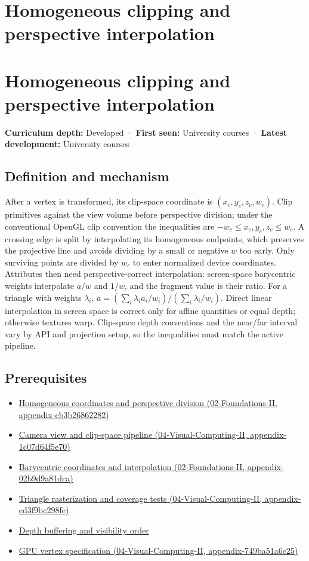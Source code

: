 \hypertarget{appendix-40426e4b2103}{}
\section*{Homogeneous clipping and perspective interpolation}
\section{Homogeneous clipping and perspective interpolation}\label{homogeneous-clipping-and-perspective-interpolation}

\textbf{Curriculum depth:} Developed · \textbf{First seen:} University courses · \textbf{Latest development:} University courses

\subsection{Definition and mechanism}\label{definition-and-mechanism}

After a vertex is transformed, its clip-space coordinate is \((x_c,y_c,z_c,w_c)\). Clip primitives against the view volume before perspective division; under the conventional OpenGL clip convention the inequalities are \(-w_c\le x_c,y_c,z_c\le w_c\). A crossing edge is split by interpolating its homogeneous endpoints, which preserves the projective line and avoids dividing by a small or negative \(w\) too early. Only surviving points are divided by \(w_c\) to enter normalized device coordinates. Attributes then need perspective-correct interpolation: screen-space barycentric weights interpolate \(a/w\) and \(1/w\), and the fragment value is their ratio. For a triangle with weights \(\lambda_i\), \(a=(\sum_i\lambda_i a_i/w_i)/(\sum_i\lambda_i/w_i)\). Direct linear interpolation in screen space is correct only for affine quantities or equal depth; otherwise textures warp. Clip-space depth conventions and the near/far interval vary by API and projection setup, so the inequalities must match the active pipeline.

\subsection{Prerequisites}\label{prerequisites}

\begin{itemize}
\tightlist
\item
  \href{}{Homogeneous coordinates and perspective division (02-Foundations-II, appendix-cb3b26862282)}
\item
  \href{}{Camera view and clip-space pipeline (04-Visual-Computing-II, appendix-1c07d64f5e70)}
\item
  \href{}{Barycentric coordinates and interpolation (02-Foundations-II, appendix-02b9d9a81dca)}
\item
  \href{}{Triangle rasterization and coverage tests (04-Visual-Computing-II, appendix-ed3f9bc298fe)}
\item
  \hyperref[appendix-97578ed97952]{Depth buffering and visibility order}
\item
  \href{}{GPU vertex specification (04-Visual-Computing-II, appendix-749ba51a6c25)}
\end{itemize}

